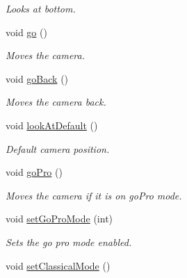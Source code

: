 \begin{DoxyCompactItemize}
\begin{DoxyCompactList}\small\item\em Looks at bottom. \end{DoxyCompactList}\item 
\hypertarget{class_c_camera_a1cc15850fd99c8f3eaaaa754ce3b7b09}{void \hyperlink{class_c_camera_a1cc15850fd99c8f3eaaaa754ce3b7b09}{go} ()}\label{class_c_camera_a1cc15850fd99c8f3eaaaa754ce3b7b09}

\begin{DoxyCompactList}\small\item\em Moves the camera. \end{DoxyCompactList}\item 
\hypertarget{class_c_camera_a2992ee97afc577babc1c9242149ac1d4}{void \hyperlink{class_c_camera_a2992ee97afc577babc1c9242149ac1d4}{go\-Back} ()}\label{class_c_camera_a2992ee97afc577babc1c9242149ac1d4}

\begin{DoxyCompactList}\small\item\em Moves the camera back. \end{DoxyCompactList}\item 
\hypertarget{class_c_camera_a44d09e2f79b96f8d963033788521add0}{void \hyperlink{class_c_camera_a44d09e2f79b96f8d963033788521add0}{look\-At\-Default} ()}\label{class_c_camera_a44d09e2f79b96f8d963033788521add0}

\begin{DoxyCompactList}\small\item\em Default camera position. \end{DoxyCompactList}\item 
\hypertarget{class_c_camera_a7529521482b348575fc467315e18a5a4}{void \hyperlink{class_c_camera_a7529521482b348575fc467315e18a5a4}{go\-Pro} ()}\label{class_c_camera_a7529521482b348575fc467315e18a5a4}

\begin{DoxyCompactList}\small\item\em Moves the camera if it is on go\-Pro mode. \end{DoxyCompactList}\item 
void \hyperlink{class_c_camera_ab692273f71887d944d66a1226c5c0c3b}{set\-Go\-Pro\-Mode} (int)
\begin{DoxyCompactList}\small\item\em Sets the go pro mode enabled. \end{DoxyCompactList}\item 
\hypertarget{class_c_camera_a8a9e733c7fca3b2aa98b4b2d99cf6b0f}{void \hyperlink{class_c_camera_a8a9e733c7fca3b2aa98b4b2d99cf6b0f}{set\-Classical\-Mode} ()}\label{class_c_camera_a8a9e733c7fca3b2aa98b4b2d99cf6b0f}


\end{DoxyCompactItemize}
